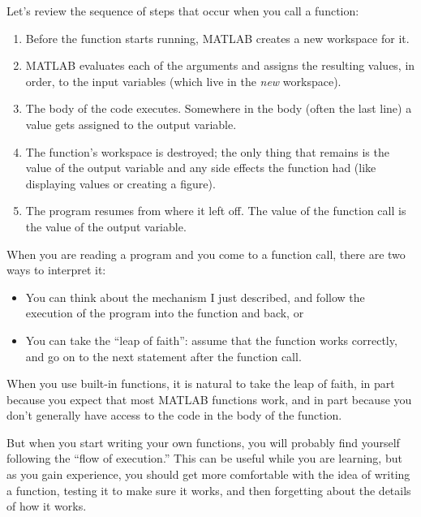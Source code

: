 \documentclass{book}
\begin{document}
Let's review the sequence of steps that occur when you call
a function:

\begin{enumerate}

\item Before the function starts running, MATLAB creates a new
workspace for it.

\item MATLAB evaluates each of the arguments and assigns
the resulting values, in order, to the input variables (which
live in the {\em new} workspace).

\item The body of the code executes.  Somewhere in the body
(often the last line) a value gets assigned to the output variable.

\item The function's workspace is destroyed; the only thing
that remains is the value of the output variable and any side
effects the function had (like displaying values or creating
a figure).

\item The program resumes from where it left off.  The value
of the function call is the value of the output variable.

\end{enumerate}

When you are reading a program and you come to a function call,
there are two ways to interpret it:

\begin{itemize}

\item You can think about the mechanism I just described,
and follow the execution of the program into the function and back, or

\item You can take the ``leap of faith'': assume that the function
works correctly, and go on to the next statement after the
function call.

\end{itemize}

When you use built-in functions, it is natural to take the leap
of faith, in part because you expect that most
MATLAB functions work, and in part because you don't
generally have access to the code in the body of the function.

But when you start writing your own functions, you will probably
find yourself following the ``flow of execution.''  This can
be useful while you are learning, but as you gain experience, you
should get more comfortable with the idea of writing a function,
testing it to make sure it works, and then forgetting about the
details of how it works.
\end{document}
